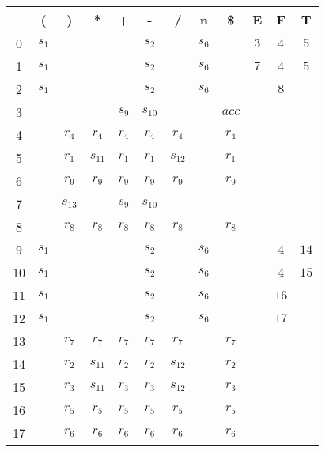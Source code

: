 \documentclass[12pt]{article}
\begin{document}
\begin{center}
	\begin{tabular}{ c | c | c | c | c | c | c | c | c | c | c | c }
			&	   (	&	   )	&	   *	&	   +	&	   -	&	   /	&	   n	&	   \$	&	   E	&	   F	&	   T	\\	\hline\hline
		0   &	\(s_1\)	&	\(\)	&	\(\)	&	\(\)	&	\(s_2\)	&	\(\)	&	\(s_6\)	&	\(\)	&	\(3\)	&	\(4\)	&	\(5\)	\\	\hline
		1   &	\(s_1\)	&	\(\)	&	\(\)	&	\(\)	&	\(s_2\)	&	\(\)	&	\(s_6\)	&	\(\)	&	\(7\)	&	\(4\)	&	\(5\)	\\	\hline
		2   &	\(s_1\)	&	\(\)	&	\(\)	&	\(\)	&	\(s_2\)	&	\(\)	&	\(s_6\)	&	\(\)	&	\(\)	&	\(8\)	&	\(\)	\\	\hline
		3   &	\(\)	&	\(\)	&	\(\)	&	\(s_9\)	&\(s_{10}\)	&	\(\)	&	\(\)	&	\(acc\)	&	\(\)	&	\(\)	&	\(\)	\\	\hline
		4   &	\(\)	&	\(r_4\)	&	\(r_4\)	&	\(r_4\)	&	\(r_4\)	&	\(r_4\)	&	\(\)	&	\(r_4\)	&	\(\)	&	\(\)	&	\(\)	\\	\hline
		5   &	\(\)	&	\(r_1\)	&\(s_{11}\)	&	\(r_1\)	&	\(r_1\)	&\(s_{12}\)	&	\(\)	&	\(r_1\)	&	\(\)	&	\(\)	&	\(\)	\\	\hline
		6   &	\(\)	&	\(r_9\)	&	\(r_9\)	&	\(r_9\)	&	\(r_9\)	&	\(r_9\)	&	\(\)	&	\(r_9\)	&	\(\)	&	\(\)	&	\(\)	\\	\hline
		7   &	\(\)	&\(s_{13}\)	&	\(\)	&	\(s_9\)	&\(s_{10}\)	&	\(\)	&	\(\)	&	\(\)	&	\(\)	&	\(\)	&	\(\)	\\	\hline
		8   &	\(\)	&	\(r_8\)	&	\(r_8\)	&	\(r_8\)	&	\(r_8\)	&	\(r_8\)	&	\(\)	&	\(r_8\)	&	\(\)	&	\(\)	&	\(\)	\\	\hline
		9   &	\(s_1\)	&	\(\)	&	\(\)	&	\(\)	&	\(s_2\)	&	\(\)	&	\(s_6\)	&	\(\)	&	\(\)	&	\(4\)	&	\(14\)	\\	\hline
		10  &	\(s_1\)	&	\(\)	&	\(\)	&	\(\)	&	\(s_2\)	&	\(\)	&	\(s_6\)	&	\(\)	&	\(\)	&	\(4\)	&	\(15\)	\\	\hline
		11  &	\(s_1\)	&	\(\)	&	\(\)	&	\(\)	&	\(s_2\)	&	\(\)	&	\(s_6\)	&	\(\)	&	\(\)	&	\(16\)	&	\(\)	\\	\hline
		12  &	\(s_1\)	&	\(\)	&	\(\)	&	\(\)	&	\(s_2\)	&	\(\)	&	\(s_6\)	&	\(\)	&	\(\)	&	\(17\)	&	\(\)	\\	\hline
		13  &	\(\)	&	\(r_7\)	&	\(r_7\)	&	\(r_7\)	&	\(r_7\)	&	\(r_7\)	&	\(\)	&	\(r_7\)	&	\(\)	&	\(\)	&	\(\)	\\	\hline
		14  &	\(\)	&	\(r_2\)	&\(s_{11}\)	&	\(r_2\)	&	\(r_2\)	&\(s_{12}\)	&	\(\)	&	\(r_2\)	&	\(\)	&	\(\)	&	\(\)	\\	\hline
		15  &	\(\)	&	\(r_3\)	&\(s_{11}\)	&	\(r_3\)	&	\(r_3\)	&\(s_{12}\)	&	\(\)	&	\(r_3\)	&	\(\)	&	\(\)	&	\(\)	\\	\hline
		16  &	\(\)	&	\(r_5\)	&	\(r_5\)	&	\(r_5\)	&	\(r_5\)	&	\(r_5\)	&	\(\)	&	\(r_5\)	&	\(\)	&	\(\)	&	\(\)	\\	\hline
		17  &	\(\)	&	\(r_6\)	&	\(r_6\)	&	\(r_6\)	&	\(r_6\)	&	\(r_6\)	&	\(\)	&	\(r_6\)	&	\(\)	&	\(\)	&	\(\)


	\end{tabular}
\end{center}
\end{document}
